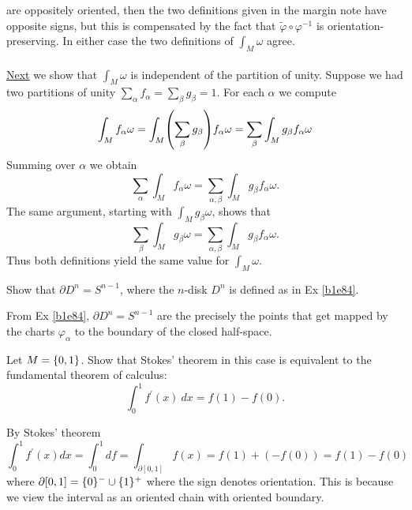\documentclass[10pt]{article}
\begin{document}
are oppositely oriented, then the two definitions given in the margin note have opposite signs, but this is compensated by the fact that $\tilde{\varphi} \circ \varphi^{-1}$ is orientation-preserving. In either case the two definitions of $\int_M \omega$ agree.\\\\
\underline{Next} we show that $\int_M \omega$ is independent of the partition of unity. Suppose we had two partitions of unity $\sum_\alpha f_\alpha = \sum_\beta g_\beta = 1$. For each $\alpha$ we compute
$$
\int_M f_\alpha \omega = \int_M \p*{\sum_\beta g_\beta} f_\alpha \omega = \sum_\beta \int_M g_\beta f_\alpha \omega
$$
Summing over $\alpha$ we obtain
$$
\sum_\alpha \int_M f_\alpha \omega = \sum_{\alpha, \beta} \int_M g_\beta f_\alpha \omega.
$$
The same argument, starting with $\int_M g_\beta\omega$, shows that
$$
\sum_\beta \int_M g_\beta \omega = \sum_{\alpha, \beta} \int_M g_\beta f_\alpha \omega.
$$
Thus both definitions yield the same value for $\int_M \omega$. 


\begin{example}
	Show that $\partial D^n = S^{n-1}$, where the $n$-disk $D^n$ is defined as in Ex \ref{b1e84}.
\end{example}
\sol From Ex \ref{b1e84}, $\partial D^n = S^{n-1}$ are the precisely the points that get mapped by the charts $\varphi_\alpha$ to the boundary of the closed half-space.


\begin{example}
	Let $M = \lbrace0,1\rbrace$. Show that Stokes' theorem in this case is equivalent to the fundamental theorem of calculus:
	$$
		\int_{0}^{1} f^\prime(x)\:dx = f(1) - f(0).
	$$
\end{example}
\sol By Stokes' theorem
$$
\int_{0}^{1} f^\prime(x)dx = \int_{0}^{1} df = \int_{\partial[0, 1]} f(x) = f(1) +(- f(0)) = f(1) - f(0)
$$
where $\partial[0, 1] = \lbrace0\rbrace^- \cup \lbrace1\rbrace^+$ where the sign denotes orientation. This is because we view the interval as an oriented chain with oriented boundary.
\end{document}
